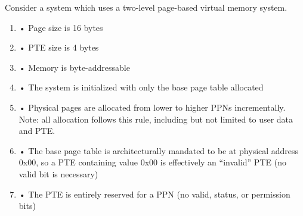 \documentclass[addpoints, 12pt, answers]{exam}
\begin{document}
\begin{questions}
	Consider a system which uses a two-level page-based virtual memory system.
	\begin{enumerate}[]
		\item• Page size is 16 bytes
		\item• PTE size is 4 bytes
		\item• Memory is byte-addressable
		\item• The system is initialized with only the base page table allocated
		\item• Physical pages are allocated from lower to higher PPNs incrementally. Note: all allocation follows this rule, including but not limited to user data and PTE.
		\item• The base page table is architecturally mandated to be at physical address 0x00, so a PTE
		containing value 0x00 is effectively an “invalid” PTE (no valid bit is necessary)
		\item• The PTE is entirely reserved for a PPN (no valid, status, or permission bits)
	\end{enumerate}

\end{questions}
\end{document}
